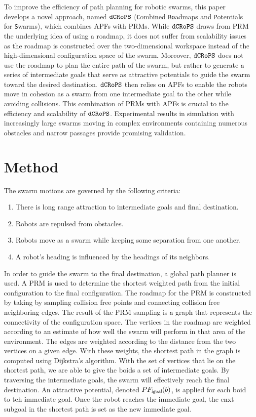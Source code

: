 \documentclass[letterpaper, 10pt, conference]{ieeeconf}
\newcommand{\Acronym}[1]{\ensuremath{{\small{\texttt{#1}}}}}
\newcommand{\Var}[1]{\ensuremath{{\small{\textsl{#1}}}}}
\newcommand{\Name}{\Acronym{dCRoPS}}
\begin{document}
To improve the efficiency of path planning for robotic swarms, this
paper develops a novel approach, named $\Name$ (\texttt{C}ombined
\texttt{Ro}admaps and \texttt{P}otentials for \texttt{S}warms), which
combines APFs with PRMs.  While $\Name$ draws from PRM the underlying
idea of using a roadmap, it does not suffer from scalability issues as
the roadmap is constructed over the two-dimensional workspace instead
of the high-dimensional configuration space of the swarm. Moreover,
$\Name$ does not use the roadmap to plan the entire path of the swarm,
but rather to generate a series of intermediate goals that serve as
attractive potentials to guide the swarm toward the desired
destination. $\Name$ then relies on APFs to enable the robots move in
cohesion as a swarm from one intermediate goal to the other while
avoiding collisions. This combination of PRMs with APFs is crucial to
the efficiency and scalability of $\Name$. Experimental results in
simulation with increasingly large swarms moving in complex
environments containing numerous obstacles and narrow passages provide
promising validation.


\section{Method}
\label{sec:Method}

The swarm motions are governed by the following criteria:
\begin{enumerate}
\item There is long range attraction to intermediate goals and final destination. 
\item Robots are repulsed from obstacles.
\item Robots move as a swarm while keeping some separation from one another.
\item A robot's heading is influenced by the headings of its neighbors.
\end{enumerate}

In order to guide the swarm to the final destination, a global path planner is
used. A PRM is used to determine the shortest weighted path from the initial
configuration to the final configuration. The roadmap for the PRM is
constructed by taking by sampling collision free points and connecting
collision free neighboring edges. The result of the PRM sampling is a graph
that represents the connectivity of the configuration space. The vertices in
the roadmap are weighted according to an estimate of how well the swarm will
perform in that area of the environment. The edges are weighted according to
the distance from the two vertices on a given edge. With these weights, the
shortest path in the graph is computed using Dijkstra's algorithm. With the set
of vertices that lie on the shortest path, we are able to give the boids a set
of intermediate goals. By traversing the intermediate goals, the swarm will
effectively reach the final destination. An attractive potential, denoted
$PF_\Var{igoal}(b)$, is applied for each boid to teh immediate goal. Once the
robot reaches the immediate goal, the enxt subgoal in the shortest path is set
as the new immediate goal.
\end{document}
